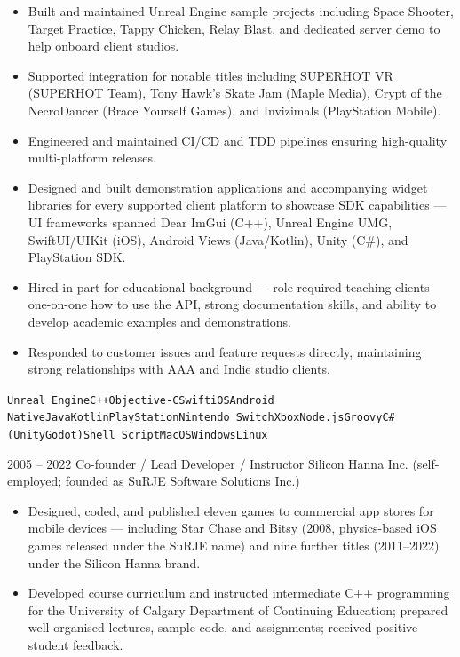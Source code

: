 \documentclass[9pt]{developercv}
\begin{document}
\begin{entrylist}
{\begin{itemize}[noitemsep,topsep=2pt,leftmargin=1em,parsep=0pt]
			  \item Built and maintained Unreal Engine sample projects including Space Shooter, Target Practice, Tappy Chicken, Relay Blast, and dedicated server demo to help onboard client studios.
			  \item Supported integration for notable titles including SUPERHOT VR (SUPERHOT Team), Tony Hawk's Skate Jam (Maple Media), Crypt of the NecroDancer (Brace Yourself Games), and Invizimals (PlayStation Mobile).
			  \item Engineered and maintained CI/CD and TDD pipelines ensuring high-quality multi-platform releases.
			  \item Designed and built demonstration applications and accompanying widget libraries for every supported client platform to showcase SDK capabilities --- UI frameworks spanned Dear ImGui (C++), Unreal Engine UMG, SwiftUI/UIKit (iOS), Android Views (Java/Kotlin), Unity (C\#), and PlayStation SDK.
			  \item Hired in part for educational background --- role required teaching clients one-on-one how to use the API, strong documentation skills, and ability to develop academic examples and demonstrations.
			  \item Responded to customer issues and feature requests directly, maintaining strong relationships with AAA and Indie studio clients.
			\end{itemize}
			\texttt{Unreal Engine}\slashsep\texttt{C++}\slashsep\texttt{Objective-C}\slashsep\texttt{Swift}\slashsep\texttt{iOS}\slashsep\texttt{Android Native}\slashsep\texttt{Java}\slashsep\texttt{Kotlin}\slashsep\texttt{PlayStation}\slashsep\texttt{Nintendo Switch}\slashsep\texttt{Xbox}\slashsep\texttt{Node.js}\slashsep\texttt{Groovy}\slashsep\texttt{C\# (Unity}\slashsep\texttt{Godot)}\slashsep\texttt{Shell Script}\slashsep\texttt{MacOS}\slashsep\texttt{Windows}\slashsep\texttt{Linux}}
	\entry
		{2005 -- 2022}
		{Co-founder / Lead Developer / Instructor}
		{Silicon Hanna Inc. (self-employed; founded as SuRJE Software Solutions Inc.)}
		{\begin{itemize}[noitemsep,topsep=2pt,leftmargin=1em,parsep=0pt]
			  \item Designed, coded, and published eleven games to commercial app stores for mobile devices --- including Star Chase and Bitsy (2008, physics-based iOS games released under the SuRJE name) and nine further titles (2011--2022) under the Silicon Hanna brand.
			  \item Developed course curriculum and instructed intermediate C++ programming for the University of Calgary Department of Continuing Education; prepared well-organised lectures, sample code, and assignments; received positive student feedback.

\end{itemize}}
\end{entrylist}
\end{document}
